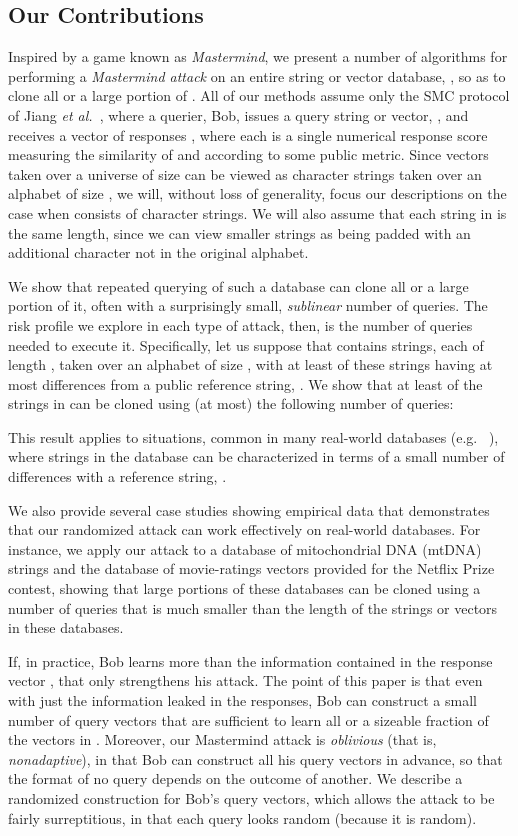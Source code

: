 \documentclass{article}
\begin{document}
\subsection{Our Contributions}
Inspired by a game known as \emph{Mastermind}, we present a number of 
algorithms for performing a \emph{Mastermind attack} on an entire string 
or vector database, , so as to clone all or
a large portion of .  All of our methods assume only the SMC 
protocol of Jiang {\it et al.}~\cite{jmcs-sddli-08}, where a querier, Bob,
issues a query string or vector, , and receives a vector of
responses , where each  is a single numerical response 
score measuring the similarity of  and  according to some
public metric.  Since vectors taken over a universe of size  can be viewed as
character strings taken over an alphabet of size , we will,
without loss of generality, focus our descriptions on the case when
 consists of  character strings.
We will also assume that each string in  is the same length, since
we can view smaller strings as being padded with an additional
character not in the original alphabet.

We show that repeated querying of such a database can clone all or a large
portion of it, often with a surprisingly small, \emph{sublinear} number of queries.
The risk profile we explore in each type of attack, then, is the
number of queries needed to execute it.
Specifically, let us suppose that  contains  strings, each of length , 
taken over an alphabet of size ,
with at least  of these strings having at most 
differences from a public reference string, .  We show that 
at least  of the strings in  can be cloned using
(at most) the following number of queries:


This result applies to situations, common in
many real-world databases (e.g. ~\cite{baldicompression07,baldidcc08,swamidasssearch07}), 
where strings in the database
can be characterized in terms of a small number of differences with a
reference string, .

We also provide several case studies showing empirical data that 
demonstrates that our
randomized attack can work effectively on real-world
databases. For instance, 
we apply our attack to a database of mitochondrial DNA (mtDNA) strings
and the database of movie-ratings vectors provided for the Netflix
Prize contest, showing that large portions of these databases can be
cloned using a number of queries that is much smaller than the length
of the strings or vectors in these databases.

If, in practice, Bob learns more than the information contained in the 
response vector , that only strengthens his attack. The
point of this paper is that even with just the information leaked in
the responses, Bob can construct a small number of query vectors that are sufficient to 
learn all or a sizeable fraction of the vectors in .
Moreover, our Mastermind attack is \emph{oblivious} (that is, \emph{nonadaptive}), 
in that Bob can construct all his query vectors in advance, so that
the format of no query depends on the outcome of another. 
We describe a randomized construction for Bob's query vectors, which
allows the attack to be fairly surreptitious, in that each query 
looks random (because it is random).
\end{document}
